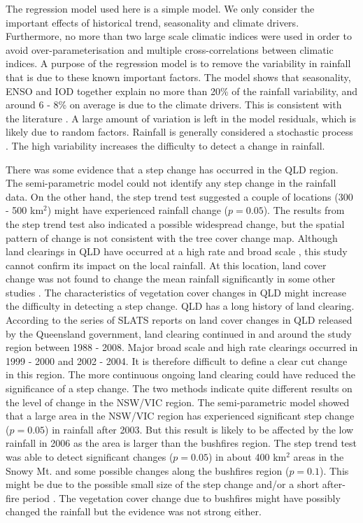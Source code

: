 \documentclass[draft,linenumbers]{agujournal}
\begin{document}
The regression model used here is a simple model. We only consider the important effects of historical trend, seasonality and climate drivers. Furthermore, no more than two large scale climatic indices were used in order to avoid over-parameterisation and multiple cross-correlations between climatic indices. A purpose of the regression model is to remove the variability in rainfall that is due to these known important factors. The model shows that seasonality, ENSO and IOD together explain no more than 20\% of the rainfall variability, and around 6 - 8\% on average is due to the climate drivers. This is consistent with the literature \citep[e.g.][]{Westra2010}. A large amount of variation is left in the model residuals, which is likely due to random factors. Rainfall is generally considered a stochastic process \citep[e.g.][]{Fowler2005,Cowpertwait2009,Burton2010}. The high variability increases the difficulty to detect a change in rainfall. 

There was some evidence that a step change has occurred in the QLD region. The semi-parametric model could not identify any step change in the rainfall data. On the other hand, the step trend test suggested a couple of locations (300 - 500 km$^2$) might have experienced rainfall change ($p = 0.05$). The results from the step trend test also indicated a possible widespread change, but the spatial pattern of change is not consistent with the tree cover change map. Although land clearings in QLD have occurred at a high rate and broad scale \citep{SLATS2005}, this study cannot confirm its impact on the local rainfall. At this location, land cover change was not found to change the mean rainfall significantly in some other studies \citep[e.g.][]{Narisma2003,McAlpine2007}. The characteristics of vegetation cover changes in QLD might increase the difficulty in detecting a step change. QLD has a long history of land clearing. According to the series of SLATS reports on land cover changes in QLD released by the Queensland government, land clearing continued in and around the study region between 1988 - 2008. Major broad scale and high rate clearings occurred in 1999 - 2000 and 2002 - 2004. It is therefore difficult to define a clear cut change in this region. The more continuous ongoing land clearing could have reduced the significance of a step change. 
The two methods indicate quite different results on the level of change in the NSW/VIC region. The semi-parametric model showed that a large area in the NSW/VIC region has experienced significant step change ($p = 0.05$) in rainfall after 2003. But this result is likely to be affected by the low rainfall in 2006 as the area is larger than the bushfires region. The step trend test was able to detect significant changes ($p = 0.05$) in about 400 km$^2$ areas in the Snowy Mt. and some possible changes along the bushfires region ($p = 0.1$). This might be due to the possible small size of the step change and/or a short after-fire period \citep{Hirsch1985}. The vegetation cover change due to bushfires might have possibly changed the rainfall but the evidence was not strong either. 
\end{document}
